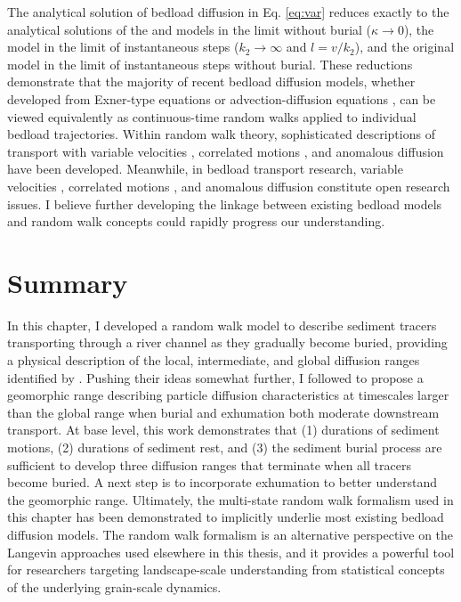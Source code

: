 The analytical solution of bedload diffusion in Eq. \ref{eq:var} reduces exactly to the analytical solutions of the \citet{Lisle1998} and \citet{Lajeunesse2017} models in the limit without burial ($\kappa \rightarrow 0$), the \citet{Wu2019} model in the limit of instantaneous steps ($k_2 \rightarrow \infty$ and $l = v/k_2$), and the original \citet{Einstein1937} model in the limit of instantaneous steps without burial.
These reductions demonstrate that the majority of recent bedload diffusion models, whether developed from Exner-type equations \citep{Wu2019,Pelosi2014,Pelosi2016} or advection-diffusion equations \citep{Lisle1998,Lajeunesse2017}, can be viewed equivalently as continuous-time random walks applied to individual bedload trajectories.
Within random walk theory, sophisticated descriptions of transport with variable velocities \citep{Zaburdaev2008,Masoliver1994}, correlated motions \citep{Escaff2018,Vicsek2012a}, and anomalous diffusion \citep{Masoliver2016,Fa2014,Metzler2014} have been developed.
Meanwhile, in bedload transport research, variable velocities \citep{Lajeunesse2010,Furbish2012,Heyman2016}, correlated motions \citep{Heyman2014,Lee2018,Saletti2020}, and anomalous diffusion \citep{Fathel2016,Bradley2017,Schumer2009} constitute open research issues.
I believe further developing the linkage between existing bedload models and random walk concepts could rapidly progress our understanding.

\section{Summary}
\label{sec:conclusion}
In this chapter, I developed a random walk model to describe sediment tracers transporting through a river channel as they gradually become buried, providing a physical description of the local, intermediate, and global diffusion ranges identified by \citet{Nikora2002}.
Pushing their ideas somewhat further, I followed \citet{Hassan2017} to propose a geomorphic range describing particle diffusion characteristics at timescales larger than the global range when burial and exhumation both moderate downstream transport.
At base level, this work demonstrates that (1) durations of sediment motions, (2) durations of sediment rest, and (3) the sediment burial process are sufficient to develop three diffusion ranges that terminate when all tracers become buried.
A next step is to incorporate exhumation to better understand the geomorphic range.
Ultimately, the multi-state random walk formalism used in this chapter has been demonstrated to implicitly underlie most existing bedload diffusion models.
The random walk formalism is an alternative perspective on the Langevin approaches used elsewhere in this thesis, and it provides a powerful tool for researchers targeting landscape-scale understanding from statistical concepts of the underlying grain-scale dynamics.
